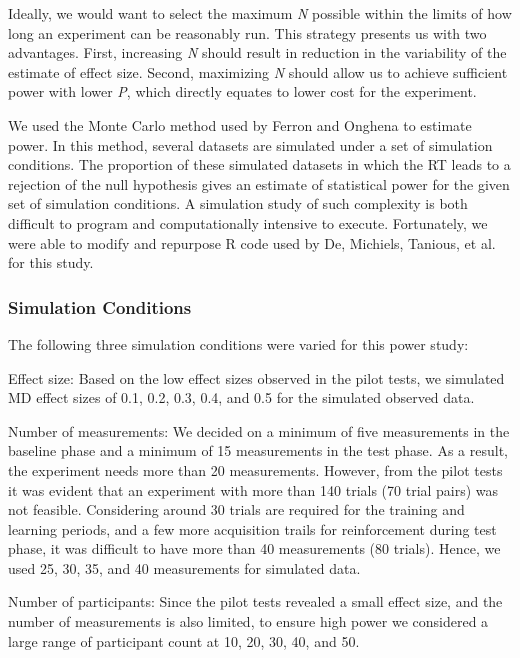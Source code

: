 \documentclass{article}
\begin{document}
Ideally, we would want to select the maximum \emph{N} possible within the limits of how long an experiment can be reasonably run. This strategy presents us with two advantages. First, increasing \emph{N} should result in reduction in the variability of the estimate of effect size. Second, maximizing \emph{N} should allow us to achieve sufficient power with lower \emph{P}, which directly equates to lower cost for the experiment.

We used the Monte Carlo method used by Ferron and Onghena \parencite{Ferron1996} to estimate power. In this method, several datasets are simulated under a set of simulation conditions. The proportion of these simulated datasets in which the RT leads to a rejection of the null hypothesis gives an estimate of statistical power for the given set of simulation conditions. A simulation study of such complexity is both difficult to program and computationally intensive to execute. Fortunately, we were able to modify and repurpose R code used by De, Michiels, Tanious, et al. \parencite{De2020} for this study. 

\subsubsection{Simulation Conditions}

The following three simulation conditions were varied for this power study:

Effect size: Based on the low effect sizes observed in the pilot tests, we simulated MD effect sizes of 0.1, 0.2, 0.3, 0.4, and 0.5 for the simulated observed data.

Number of measurements: We decided on a minimum of five measurements in the baseline phase and a minimum of 15 measurements in the test phase. As a result, the experiment needs more than 20 measurements. However, from the pilot tests it was evident that an experiment with more than 140 trials (70 trial pairs) was not feasible. Considering around 30 trials are required for the training and learning periods, and a few more acquisition trails for reinforcement during test phase, it was difficult to have more than 40 measurements (80 trials). Hence, we used 25, 30, 35, and 40 measurements for simulated data. 

Number of participants: Since the pilot tests revealed a small effect size, and the number of measurements is also limited, to ensure high power we considered a large range of participant count at 10, 20, 30, 40, and 50. 
\end{document}
